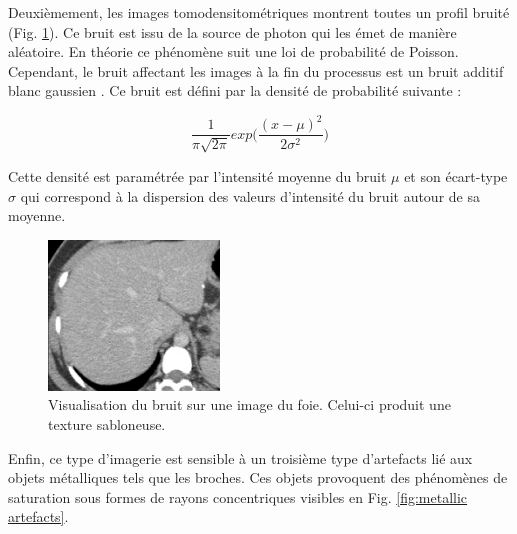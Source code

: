 
Deuxièmement, les images tomodensitométriques montrent toutes un profil bruité (Fig. \ref{fig:CT_noise}). Ce bruit est issu de la source de photon qui les émet de manière aléatoire. En théorie ce phénomène suit une loi de probabilité de Poisson. Cependant, le bruit affectant les images à la fin du processus est un bruit additif blanc gaussien \cite{Lei1992_gaussianNoiseCT}. Ce bruit est défini par la densité de probabilité suivante :

\begin{equation}
\frac{1}{\pi \sqrt{2\pi} } exp\big( \frac{ (x-\mu)^2}{2\sigma^2} )    
\end{equation}

Cette densité est paramétrée par l'intensité moyenne du bruit $\mu$ et son écart-type $\sigma$ qui correspond à la dispersion des valeurs d'intensité du bruit autour de sa moyenne.

\begin{figure}
    \centering
    \includegraphics[height=4cm]{Images/noise_CT.png}
    \caption{Visualisation du bruit sur une image du foie. Celui-ci produit une texture sabloneuse.}
    \label{fig:CT_noise}
\end{figure}

Enfin, ce type d'imagerie est sensible à un troisième type d'artefacts lié aux objets métalliques tels que les broches. Ces objets provoquent des phénomènes de saturation sous formes de rayons concentriques visibles en Fig. \ref{fig:metallic artefacts}.

